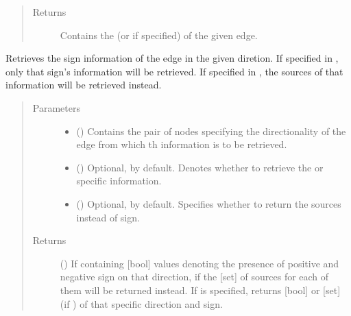 \documentclass[letterpaper,10pt,english]{sphinxmanual}
\begin{document}
\begin{fulllineitems}
\begin{fulllineitems}
\begin{quote}
\begin{description}
\item[{Returns}] \leavevmode
Contains the  (or  if
specified) of the given edge.

\end{description}\end{quote}

\end{fulllineitems}


\begin{fulllineitems}
\label{\detokenize{main:pypath.main.Direction.get_sign}}
Retrieves the sign information of the edge in the given
diretion. If specified in , only that sign’s information
will be retrieved. If specified in , the sources of
that information will be retrieved instead.
\begin{quote}\begin{description}
\item[{Parameters}] \leavevmode\begin{itemize}
\item {} 
 () \textendash{} Contains the pair of nodes specifying the directionality of
the edge from which th information is to be retrieved.

\item {} 
 () \textendash{} Optional,  by default. Denotes whether to retrieve
the  or  specific information.

\item {} 
 () \textendash{} Optional,  by default. Specifies whether to return
the sources instead of sign.

\end{itemize}

\item[{Returns}] \leavevmode
() \textendash{} If  containing {[}bool{]} values
denoting the presence of positive and negative sign on that
direction, if  the {[}set{]} of sources for each
of them will be returned instead. If  is specified,
returns {[}bool{]} or {[}set{]} (if ) of that
specific direction and sign.


\end{description}
\end{quote}
\end{fulllineitems}
\end{fulllineitems}
\end{document}
